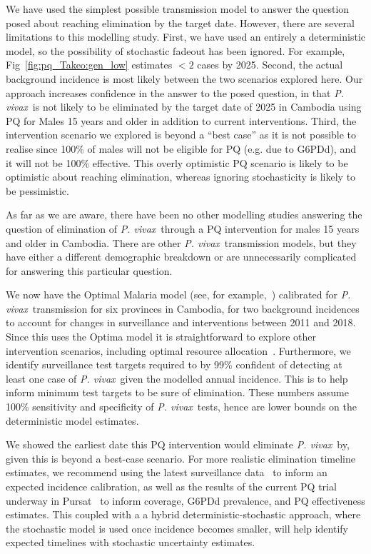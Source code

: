 \documentclass[doublespacing]{bmcart}
\newcommand{\pv}{\textit{P. vivax}}
\begin{document}
We have used the simplest possible transmission model to answer the question posed about reaching elimination by the target date. However, there are several limitations to this modelling study. First, we have used an entirely a deterministic model, so the possibility of stochastic fadeout has been ignored. For example, Fig~\ref{fig:pq_Takeo:gen_low} estimates $<2$ cases by 2025. Second, the actual background incidence is most likely between the two scenarios explored here. Our approach increases confidence in the answer to the posed question, in that \pv~is not likely to be eliminated by the target date of 2025 in Cambodia using PQ for Males 15 years and older in addition to current interventions. Third, the intervention scenario we explored is beyond a ``best case'' as it is not possible to realise since 100\% of males will not be eligible for PQ (e.g. due to G6PDd), and it will not be 100\% effective. This overly optimistic PQ scenario is likely to be optimistic about reaching elimination, whereas ignoring stochasticity is likely to be pessimistic. 

As far as we are aware, there have been no other modelling studies answering the question of elimination of \pv~through a PQ intervention for males 15 years and older in Cambodia. There are other \pv~transmission models, but they have either a different demographic breakdown or are unnecessarily complicated for answering this particular question.

We now have the Optimal Malaria model (see, for example,~\cite{scott}) calibrated for \pv~transmission for six provinces in Cambodia, for two background incidences to account for changes in surveillance and interventions between 2011 and 2018. Since this uses the Optima model it is straightforward to explore other intervention scenarios, including optimal resource allocation~\cite{optima}.
% 
Furthermore, we identify surveillance test targets required to by 99\% confident of detecting at least one case of \pv~given the modelled annual incidence. This is to help inform minimum test targets to be sure of elimination. These numbers assume 100\% sensitivity and specificity of \pv~tests, hence are lower bounds on the deterministic model estimates.

 We showed the earliest date this PQ intervention would eliminate \pv~by, given this is beyond a best-case scenario. For more realistic elimination timeline estimates, we recommend using the latest surveillance data~\cite{pengby_mobile} to inform an expected incidence calibration, as well as the results of the current PQ trial underway in Pursat~\cite{CNM_trial} to inform coverage, G6PDd prevalence, and PQ effectiveness estimates. This coupled with a a hybrid deterministic-stochastic approach, where the stochastic model is used once incidence becomes smaller, will help identify expected timelines with stochastic uncertainty estimates. 
\end{document}
